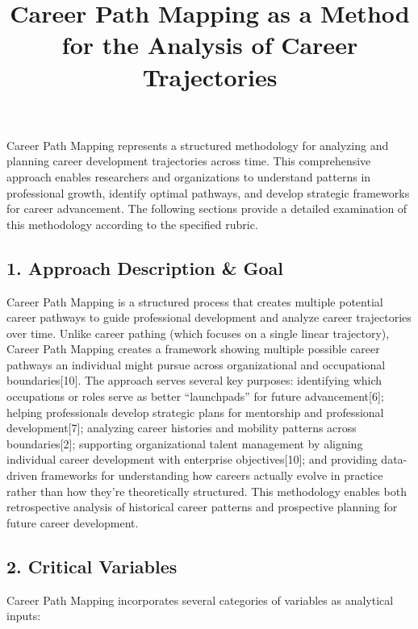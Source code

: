 \documentclass[
  letterpaper,
  DIV=11,
  numbers=noendperiod]{scrartcl}
\title{Career Path Mapping as a Method for the Analysis of Career
Trajectories}
\author{}
\date{}
\begin{document}
\maketitle


Career Path Mapping represents a structured methodology for analyzing
and planning career development trajectories across time. This
comprehensive approach enables researchers and organizations to
understand patterns in professional growth, identify optimal pathways,
and develop strategic frameworks for career advancement. The following
sections provide a detailed examination of this methodology according to
the specified rubric.

\subsection{1. Approach Description \&
Goal}\label{approach-description-goal}

Career Path Mapping is a structured process that creates multiple
potential career pathways to guide professional development and analyze
career trajectories over time. Unlike career pathing (which focuses on a
single linear trajectory), Career Path Mapping creates a framework
showing multiple possible career pathways an individual might pursue
across organizational and occupational boundaries{[}10{]}. The approach
serves several key purposes: identifying which occupations or roles
serve as better ``launchpads'' for future advancement{[}6{]}; helping
professionals develop strategic plans for mentorship and professional
development{[}7{]}; analyzing career histories and mobility patterns
across boundaries{[}2{]}; supporting organizational talent management by
aligning individual career development with enterprise
objectives{[}10{]}; and providing data-driven frameworks for
understanding how careers actually evolve in practice rather than how
they're theoretically structured. This methodology enables both
retrospective analysis of historical career patterns and prospective
planning for future career development.

\subsection{2. Critical Variables}\label{critical-variables}

Career Path Mapping incorporates several categories of variables as
analytical inputs:
\end{document}
